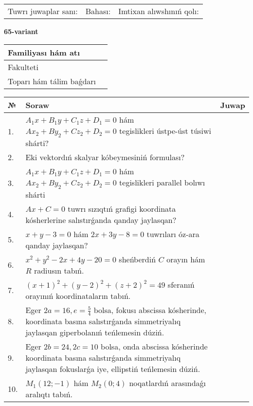 \documentclass{article}
\begin{document}
\vspace{1cm}

\begin{tabular}{lll}
Tuwrı juwaplar sanı: \underline{\hspace{1.5cm}} & 
Bahası: \underline{\hspace{1.5cm}} & 
Imtixan alıwshınıń qolı: \underline{\hspace{2cm}} \\
\end{tabular}

\egroup

\newpage


\textbf{65-variant}\\

\bgroup
\def\arraystretch{1.6} %

\begin{tabular}{|m{5.7cm}|m{9.5cm}|}
\hline
Familiyası hám atı & \\
\hline
Fakulteti  & \\
\hline
Toparı hám tálim baǵdarı  & \\
\hline
\end{tabular}

\vspace{1cm}

\begin{tabular}{|m{0.7cm}|m{10cm}|m{4cm}|}
\hline
№ & Soraw & Juwap \\
\hline
1. & $A_1x+B_1y+C_1z+D_1=0$ hám $Ax_2+By_2+Cz_2+D_2=0$ tegislikleri ústpe-úst túsiwi shárti? &  \\
\hline
2. & Eki vektordıń skalyar kóbeymesiniń formulası? &  \\
\hline
3. & $A_1x+B_1y+C_1z+D_1=0$ hám $Ax_2+By_2+Cz_2+D_2=0$ tegislikleri parallel bolıwı shárti &  \\
\hline
4. & $Ax+C=0$ tuwrı sızıqtıń grafigi koordinata kósherlerine salıstırǵanda qanday jaylasqan? &  \\
\hline
5. & $x+y-3=0$ hám $2x+3y-8=0$ tuwrıları óz-ara qanday jaylasqan? &  \\
\hline
6. & $x^{2}+y^{2}-2x+4y-20=0$ sheńberdiń $C$ orayın hám $R$ radiusın tabıń. &  \\
\hline
7. & $(x+1)^{2}+(y-2) ^{2}+(z+2) ^{2}=49$ sferanıń orayınıń koordinataların tabıń. &  \\
\hline
8. & Eger $2a=16, e=\frac{5}{4}$ bolsa, fokusı abscissa kósherinde, koordinata basına salıstırǵanda simmetriyalıq jaylasqan giperbolanıń teńlemesin dúziń. &  \\
\hline
9. & Eger $2b=24, 2 c=10$ bolsa, onda abscissa kósherinde koordinata basına salıstırǵanda simmetriyalıq jaylasqan fokuslarǵa iye, ellipstiń teńlemesin dúziń. &  \\
\hline
10. & $M_{1} (12;-1)$ hám $M_{2} (0;4)$ noqatlardıń arasındaǵı aralıqtı tabıń. &  \\
\hline
\end{tabular}
\end{document}
